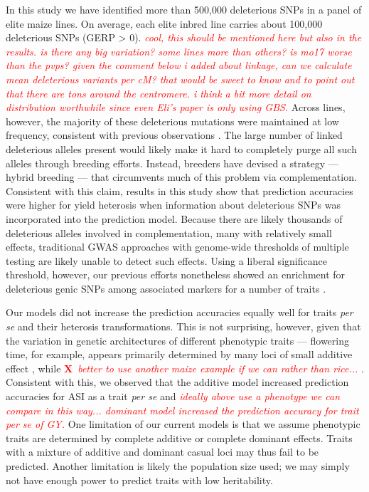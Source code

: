 \documentclass[9pt,twocolumn,twoside]{gsajnl}
\newcommand{\X}{\textcolor{red}{\bf X\,}}
\newcommand{\jri}[1]{\textcolor{red}{ \emph{ #1}} }
\begin{document}
In this study we have identified more than 500,000 deleterious SNPs in a panel of elite maize lines.
On average, each elite inbred line carries about 100,000 deleterious SNPs (GERP > 0). \jri{cool, this should be mentioned here but also in the results. is there any big variation?  some lines more than others? is mo17 worse than the pvps? given the comment below i added about linkage, can we calculate mean deleterious variants per cM?  that would be sweet to know and to point out that there are tons around the centromere. i think a bit more detail on distribution worthwhile since even Eli's paper is only using GBS.}
Across lines, however, the majority of these deleterious mutations were maintained at low frequency, consistent with previous observations \citep{rodgers2015recombination}. 
The large number of linked deleterious alleles present would likely make it hard to completely purge all such alleles through breeding efforts. Instead, breeders have devised a strategy --- hybrid breeding --- that circumvents much of this problem via complementation.
Consistent with this claim, results in this study show that prediction accuracies were higher for yield heterosis when information about deleterious SNPs was incorporated into the prediction model.  
Because there are likely thousands of deleterious alleles involved in complementation, many with relatively small effects, traditional GWAS approaches with genome-wide thresholds of multiple testing are likely unable to detect such effects.
Using a liberal significance threshold, however, our previous efforts nonetheless showed an enrichment for deleterious genic SNPs among associated markers for a number of traits \citep{Mezmouk2014}.

Our models did not increase the prediction accuracies equally well for traits \emph{per se} and their heterosis transformations. 
This is not surprising, however, given that the variation in genetic architectures of different phenotypic traits --- flowering time, for example, appears primarily determined by many loci of small additive effect \citep{buckler2009genetic}, while \X \jri{better to use another maize example if we can rather than rice...}. 
Consistent with this, we observed that the additive model increased prediction accuracies for ASI as a trait \emph{per se} and \jri{ideally above use a phenotype we can compare in this way... dominant model increased the prediction accuracy for trait \emph{per se} of GY.} 
One limitation of our current models is that we assume phenotypic traits are determined by complete additive or complete dominant effects. 
Traits with a mixture of additive and dominant casual loci may thus fail to be predicted. 
Another limitation is likely the population size used; we may simply not have enough power to predict traits with low heritability. 
\end{document}
